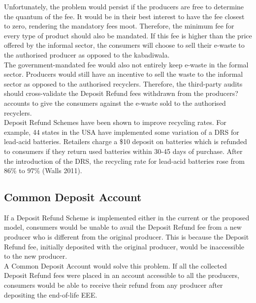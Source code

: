 \documentclass[a4paper, 12pt]{article}
\begin{document}
                    Unfortunately, the problem would persist if the producers are free to determine the quantum of the fee. It would be in their best interest to have the fee closest to zero, rendering the mandatory fees moot. Therefore, the minimum fee for every type of product should also be mandated. If this fee is higher than the price offered by the informal sector, the consumers will choose to sell their e-waste to the authorised producer as opposed to the kabadiwala. \\
                    
                    The government-mandated fee would also not entirely keep e-waste in the formal sector. Producers would still have an incentive to sell the waste to the informal sector as opposed to the authorised recyclers. Therefore, the third-party audits should cross-validate the Deposit Refund fees withdrawn from the producers? accounts to give the consumers against the e-waste sold to the authorised recyclers. \\
                    
                    Deposit Refund Schemes have been shown to improve recycling rates. For example, 44 states in the USA have implemented some variation of a DRS for lead-acid batteries. Retailers charge a \$10 deposit on batteries which is refunded to consumers if they return used batteries within 30-45 days of purchase. After the introduction of the DRS, the recycling rate for lead-acid batteries rose from 86\% to 97\% (Walls 2011).\\
                    
                    \subsection{Common Deposit Account}
                    
                    If a Deposit Refund Scheme is implemented either in the current or the proposed model, consumers would be unable to avail the Deposit Refund fee from a new producer who is different from the original producer. This is  because the Deposit Refund fee, initially deposited with the original producer, would be inaccessible to the new producer. \\
                    
                    A Common Deposit Account would solve this problem. If all the collected Deposit Refund fees were placed in an account accessible to all the producers, consumers would be able to receive their refund from any producer after depositing the end-of-life EEE. \\
                    
\end{document}
